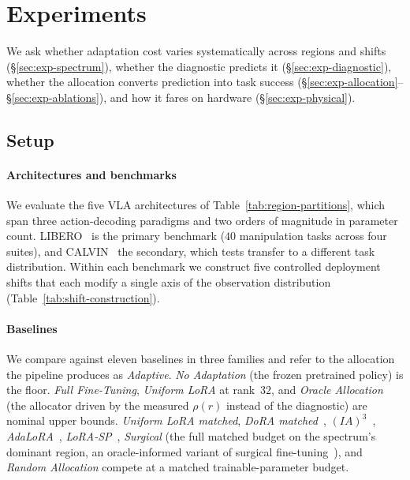 \section{Experiments}
\label{sec:experiments}

We ask whether adaptation cost varies systematically across regions and shifts (\S\ref{sec:exp-spectrum}), whether the diagnostic predicts it (\S\ref{sec:exp-diagnostic}), whether the allocation converts prediction into task success (\S\ref{sec:exp-allocation}--\S\ref{sec:exp-ablations}), and how it fares on hardware (\S\ref{sec:exp-physical}).



\subsection{Setup}
\label{sec:exp-setup}

\paragraph{Architectures and benchmarks}
We evaluate the five VLA architectures of Table~\ref{tab:region-partitions}, which span three action-decoding paradigms and two orders of magnitude in parameter count.
LIBERO~\cite{Liu2023LIBERO} is the primary benchmark ($40$ manipulation tasks across four suites), and CALVIN~\cite{Mees2022CALVIN} the secondary, which tests transfer to a different task distribution.
Within each benchmark we construct five controlled deployment shifts that each modify a single axis of the observation distribution (Table~\ref{tab:shift-construction}).



\paragraph{Baselines}
We compare against eleven baselines in three families and refer to the allocation the pipeline produces as \emph{Adaptive}.
\emph{No Adaptation} (the frozen pretrained policy) is the floor.
\emph{Full Fine-Tuning}, \emph{Uniform LoRA} at rank~$32$, and \emph{Oracle Allocation} (the allocator driven by the measured $\rho(r)$ instead of the diagnostic) are nominal upper bounds.
\emph{Uniform LoRA matched}, \emph{DoRA matched}~\cite{Liu2024DoRA}, \emph{$(IA)^3$}~\cite{Liu2022FewShot}, \emph{AdaLoRA}~\cite{Zhang2023AdaLoRA}, \emph{LoRA-SP}~\cite{Kim2026LoRASP}, \emph{Surgical} (the full matched budget on the spectrum's dominant region, an oracle-informed variant of surgical fine-tuning~\cite{Lee2023Surgical}), and \emph{Random Allocation} compete at a matched trainable-parameter budget.

